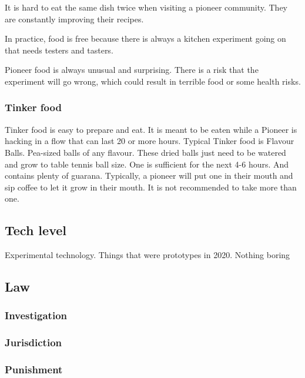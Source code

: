 It is hard to eat the same dish twice when visiting a pioneer community. They are constantly improving their recipes.

In practice, food is free because there is always a kitchen experiment going on that needs testers and tasters.

Pioneer food is always unusual and surprising. There is a risk that the experiment will go wrong, which could result in terrible food or some health risks.

\subsubsection{Tinker food}

Tinker food is easy to prepare and eat. It is meant to be eaten while a Pioneer is hacking in a flow that can last 20 or more hours. Typical Tinker food is Flavour Balls. Pea-sized balls of any flavour. These dried balls just need to be watered and grow to table tennis ball size. One is sufficient for the next 4-6 hours. And contains plenty of guarana.
Typically, a pioneer will put one in their mouth and sip coffee to let it grow in their mouth. It is not recommended to take more than one.

\subsection{Tech level}

Experimental technology. Things that were prototypes in 2020. Nothing boring

\subsection{Law}
\label{sec: pioneer law}

\subsubsection{Investigation}


\subsubsection{Jurisdiction}


\subsubsection{Punishment}

